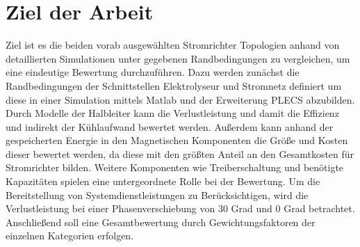 \section{Ziel der Arbeit}
Ziel ist es die beiden vorab ausgewählten Stromrichter Topologien anhand von detaillierten Simulationen unter gegebenen Randbedingungen zu vergleichen, um eine eindeutige Bewertung durchzuführen. Dazu werden zunächst die Randbedingungen der Schnittstellen Elektrolyseur und Stromnetz definiert um diese in einer Simulation mittels Matlab und der Erweiterung PLECS abzubilden. Durch Modelle der Halbleiter kann die Verlustleistung und damit die Effizienz und indirekt der Kühlaufwand bewertet werden. Außerdem kann anhand der gespeicherten Energie in den Magnetischen Komponenten die Größe und Kosten dieser bewertet werden, da diese mit den größten Anteil an den Gesamtkosten für Stromrichter bilden. Weitere Komponenten wie Treiberschaltung und benötigte Kapazitäten spielen eine untergeordnete Rolle bei der Bewertung. Um die Bereitstellung von Systemdienstleistungen zu Berücksichtigen, wird die Verlustleistung bei einer Phasenverschiebung von 30 Grad und 0 Grad betrachtet. Anschließend soll eine Gesamtbewertung durch Gewichtungsfaktoren der einzelnen Kategorien erfolgen.